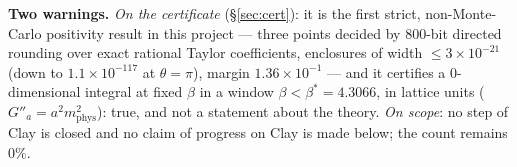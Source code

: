 \smallskip
\noindent
\textbf{Two warnings.} \emph{On the certificate} (\S\ref{sec:cert}): it is the first strict,
non-Monte-Carlo positivity result in this project --- three points decided by $800$-bit directed
rounding over exact rational Taylor coefficients, enclosures of width $\le3\times10^{-21}$ (down to
$1.1\times10^{-117}$ at $\theta=\pi$), margin $1.36\times10^{-1}$ --- and it certifies a
$0$-dimensional integral at fixed $\beta$ in a window $\beta<\beta^{*}=4.3066$, in lattice units
($G''_a=a^{2}m^{2}_{\mathrm{phys}}$): true, and not a statement about the theory.
\emph{On scope}: no step of Clay is closed and no claim of progress on Clay is made below; the
count remains $0\%$.
